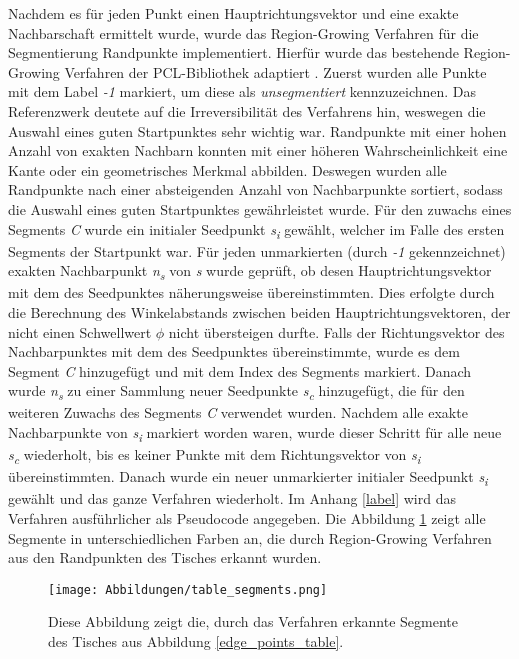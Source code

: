 Nachdem es für jeden Punkt einen Hauptrichtungsvektor und eine exakte Nachbarschaft ermittelt wurde, wurde das Region-Growing Verfahren für die Segmentierung Randpunkte implementiert. Hierfür wurde das bestehende Region-Growing Verfahren der PCL-Bibliothek adaptiert \autocite{rusu_3d_2011}. Zuerst wurden alle Punkte mit dem Label \textit{-1} markiert, um diese als \textit{unsegmentiert} kennzuzeichnen. Das Referenzwerk deutete auf die Irreversibilität des Verfahrens hin, weswegen die Auswahl eines guten Startpunktes sehr wichtig war. Randpunkte mit einer hohen Anzahl von exakten Nachbarn konnten mit einer höheren Wahrscheinlichkeit eine Kante oder ein geometrisches Merkmal abbilden. Deswegen wurden alle Randpunkte nach einer absteigenden Anzahl von Nachbarpunkte sortiert, sodass die Auswahl eines guten Startpunktes gewährleistet wurde. Für den zuwachs eines Segments \textit{C} wurde ein initialer Seedpunkt \textit{s\textsubscript{i}} gewählt, welcher im Falle des ersten Segments der Startpunkt war. Für jeden unmarkierten (durch \textit{-1} gekennzeichnet) exakten Nachbarpunkt \textit{n\textsubscript{s}} von \textit{s} wurde geprüft, ob desen Hauptrichtungsvektor mit dem des Seedpunktes näherungsweise übereinstimmten. Dies erfolgte durch die Berechnung des Winkelabstands zwischen beiden Hauptrichtungsvektoren, der nicht einen Schwellwert $\phi$ nicht übersteigen durfte. Falls der Richtungsvektor des Nachbarpunktes mit dem des Seedpunktes übereinstimmte, wurde es dem Segment \textit{C} hinzugefügt und mit dem Index des Segments markiert. Danach wurde \textit{n\textsubscript{s}} zu einer Sammlung neuer Seedpunkte \textit{s\textsubscript{c}} hinzugefügt, die für den weiteren Zuwachs des Segments \textit{C} verwendet wurden. Nachdem alle exakte Nachbarpunkte von \textit{s\textsubscript{i}} markiert worden waren, wurde dieser Schritt für alle neue \textit{s\textsubscript{c}} wiederholt, bis es keiner Punkte mit dem Richtungsvektor von \textit{s\textsubscript{i}} übereinstimmten. Danach wurde ein neuer unmarkierter initialer Seedpunkt \textit{s\textsubscript{i}} gewählt und das ganze Verfahren wiederholt. Im Anhang \ref{label} wird das Verfahren ausführlicher als Pseudocode angegeben. Die Abbildung \ref{segments_table} zeigt alle Segmente in unterschiedlichen Farben an, die durch Region-Growing Verfahren aus den Randpunkten des Tisches erkannt wurden.

\begin{figure}[h]
	\texttt{[image: Abbildungen/table\_segments.png]}
	\centering
	\caption{Diese Abbildung zeigt die, durch das Verfahren erkannte  Segmente des Tisches aus Abbildung \ref{edge_points_table}.}
	\label{segments_table}
\end{figure}

